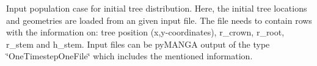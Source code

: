 Input population case for initial tree distribution. Here, the initial tree locations and geometries are loaded from an given input file. The file needs to contain rows with the information on\+: tree position (x,y-\/coordinates), r\+\_\+crown, r\+\_\+root, r\+\_\+stem and h\+\_\+stem. Input files can be py\+MANGA output of the type \char`\"{}\+One\+Timestep\+One\+File\char`\"{} which includes the mentioned information. 